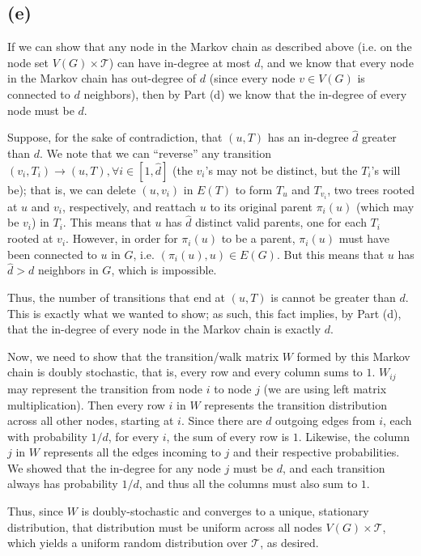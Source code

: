 \documentclass{6046}
\begin{document}
\subsection*{(e)}
If we can show that any node in the Markov chain as described above
(i.e. on the node set $V(G) \times \mathcal{T}$) can have
in-degree at most $d$, and we know that every node in the Markov
chain has out-degree of $d$ (since every node $v \in V(G)$
is connected to $d$ neighbors), then by Part (d) we know
that the in-degree of every node must be $d$.

Suppose, for the sake of contradiction, 
that $(u, T)$ has an in-degree $\hat d$ greater than $d$. We note that
we can ``reverse'' any transition $(v_i, T_i) \rightarrow (u, T),
\forall i \in [1, \hat d]$ (the $v_i$'s may not be distinct, but
the $T_i$'s will be); that is, we can delete
$(u, v_i)$ in $E(T)$ to form $T_u$ and $T_{v_i}$,
two trees rooted at $u$ and $v_i$, respectively, and reattach
$u$ to its original parent $\pi_i(u)$ (which may be $v_i$) in $T_i$. This means
that $u$ has $\hat d$ distinct valid parents, one for each $T_i$
rooted at $v_i$. However, in order for $\pi_i(u)$ to be a parent,
$\pi_i(u)$ must have been connected to $u$ in $G$, i.e.
$(\pi_i(u), u) \in E(G)$. But this means that $u$ has $\hat d > d$
neighbors in $G$, which is impossible.

Thus, the number of transitions that
end at $(u, T)$ is cannot be greater than $d$. This is
exactly what we wanted to show; as such, this fact implies,
by Part (d), that the in-degree of every node in the
Markov chain is exactly $d$.

Now, we need to show that the transition/walk matrix $W$
formed by this Markov chain is doubly stochastic, that is,
every row and every column sums to $1$.
$W_{ij}$ may represent the transition from node $i$ to node $j$
(we are using left matrix multiplication). Then every row $i$
in $W$ represents the transition distribution across
all other nodes, starting at $i$. Since there are
$d$ outgoing edges from $i$, each with probability $1/d$,
for every $i$, the sum of every row is $1$.
Likewise, the column $j$ in $W$ represents all the 
edges incoming to $j$ and their respective probabilities.
We showed that the in-degree for any node $j$ must be $d$,
and each transition always has probability $1/d$, and
thus all the columns must also sum to $1$.

Thus, since $W$ is doubly-stochastic and converges to
a unique, stationary distribution, that distribution
must be uniform across all nodes $V(G) \times \mathcal{T}$,
which yields a uniform random distribution over $\mathcal{T}$,
as desired.
\end{document}
